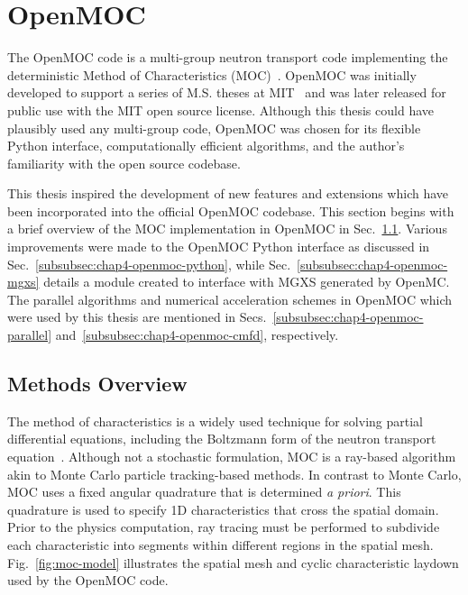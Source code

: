 \section{OpenMOC}
\label{sec:chap4-openmoc}

The OpenMOC code is a multi-group neutron transport code implementing the deterministic Method of Characteristics (MOC)~\cite{boyd2014openmoc}. OpenMOC was initially developed to support a series of M.S. theses at MIT~\cite{li2013ms,boyd2014ms,shaner2014ms} and was later released for public use with the MIT open source license. Although this thesis could have plausibly used any multi-group code, OpenMOC was chosen for its flexible Python interface, computationally efficient algorithms, and the author's familiarity with the open source codebase.


This thesis inspired the development of new features and extensions which have been incorporated into the official OpenMOC codebase. This section begins with a brief overview of the \ac{MOC} implementation in OpenMOC in Sec.~\ref{subsubsec:chap4-openmoc-overview}. Various improvements were made to the OpenMOC Python interface as discussed in Sec.~\ref{subsubsec:chap4-openmoc-python}, while Sec.~\ref{subsubsec:chap4-openmoc-mgxs} details a module created to interface with \ac{MGXS} generated by OpenMC. The parallel algorithms and numerical acceleration schemes in OpenMOC which were used by this thesis are mentioned in Secs.~\ref{subsubsec:chap4-openmoc-parallel} and~\ref{subsubsec:chap4-openmoc-cmfd}, respectively.


\subsection{Methods Overview}
\label{subsubsec:chap4-openmoc-overview}

The method of characteristics is a widely used technique for solving partial differential equations, including the Boltzmann form of the neutron transport equation~\cite{askew1972moc}. Although not a stochastic formulation, \ac{MOC} is a ray-based algorithm akin to Monte Carlo particle tracking-based methods. In contrast to Monte Carlo, \ac{MOC} uses a fixed angular quadrature that is determined \textit{a priori}. This quadrature is used to specify 1D characteristics that cross the spatial domain. Prior to the physics computation, ray tracing must be performed to subdivide each characteristic into segments within different regions in the spatial mesh. Fig.~\ref{fig:moc-model} illustrates the spatial mesh and cyclic characteristic laydown used by the OpenMOC code.


